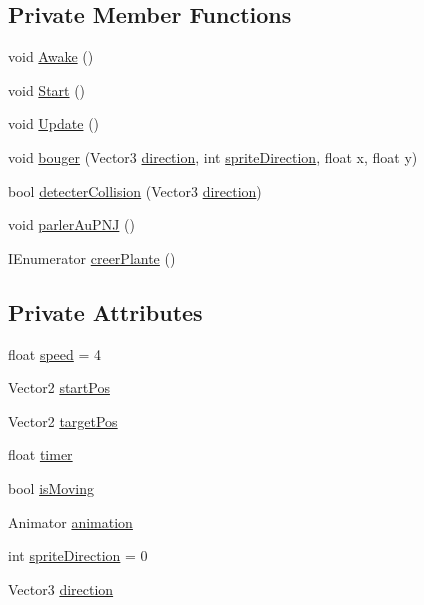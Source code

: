 \subsection*{Private Member Functions}
\begin{DoxyCompactItemize}
\item 
void \mbox{\hyperlink{class_controleur_joueur_a81c77842ce406f01ce89e4ea7cdc47e3}{Awake}} ()
\item 
void \mbox{\hyperlink{class_controleur_joueur_adf151124295f736d0d940a3b3601f35e}{Start}} ()
\item 
void \mbox{\hyperlink{class_controleur_joueur_a071e21e095c237bccef56bd6bea690fc}{Update}} ()
\item 
void \mbox{\hyperlink{class_controleur_joueur_af1b2d1d91472251e5c57d50aa7422b10}{bouger}} (Vector3 \mbox{\hyperlink{class_controleur_joueur_a54e1860c30d3fc26fe74a4caeb52c66b}{direction}}, int \mbox{\hyperlink{class_controleur_joueur_a47070fe9a7773bfd9f110deef20ce097}{sprite\+Direction}}, float x, float y)
\item 
bool \mbox{\hyperlink{class_controleur_joueur_a2943f91d2df443fc1a3208dbe57f9f9c}{detecter\+Collision}} (Vector3 \mbox{\hyperlink{class_controleur_joueur_a54e1860c30d3fc26fe74a4caeb52c66b}{direction}})
\item 
void \mbox{\hyperlink{class_controleur_joueur_ab65cb2d9d498fb5f21f542c03878189f}{parler\+Au\+P\+NJ}} ()
\item 
I\+Enumerator \mbox{\hyperlink{class_controleur_joueur_adcda5dbe099ac9d9276d052759ea6cab}{creer\+Plante}} ()
\end{DoxyCompactItemize}
\subsection*{Private Attributes}
\begin{DoxyCompactItemize}
\item 
float \mbox{\hyperlink{class_controleur_joueur_a0ac61d9623f2148f02c60a4e0c6b6e4c}{speed}} = 4
\item 
Vector2 \mbox{\hyperlink{class_controleur_joueur_a0ead80c9a1e0819235ec62038b274fd4}{start\+Pos}}
\item 
Vector2 \mbox{\hyperlink{class_controleur_joueur_aa64173e4c604d9e2d6a646a7cff95a35}{target\+Pos}}
\item 
float \mbox{\hyperlink{class_controleur_joueur_aca7166f5bec51b3af5982dbafe681305}{timer}}
\item 
bool \mbox{\hyperlink{class_controleur_joueur_a6b328040f56d41178757fcc561bf9334}{is\+Moving}}
\item 
Animator \mbox{\hyperlink{class_controleur_joueur_aac567782c2c28039b94ca89700437d97}{animation}}
\item 
int \mbox{\hyperlink{class_controleur_joueur_a47070fe9a7773bfd9f110deef20ce097}{sprite\+Direction}} = 0
\item 
Vector3 \mbox{\hyperlink{class_controleur_joueur_a54e1860c30d3fc26fe74a4caeb52c66b}{direction}}
\end{DoxyCompactItemize}


